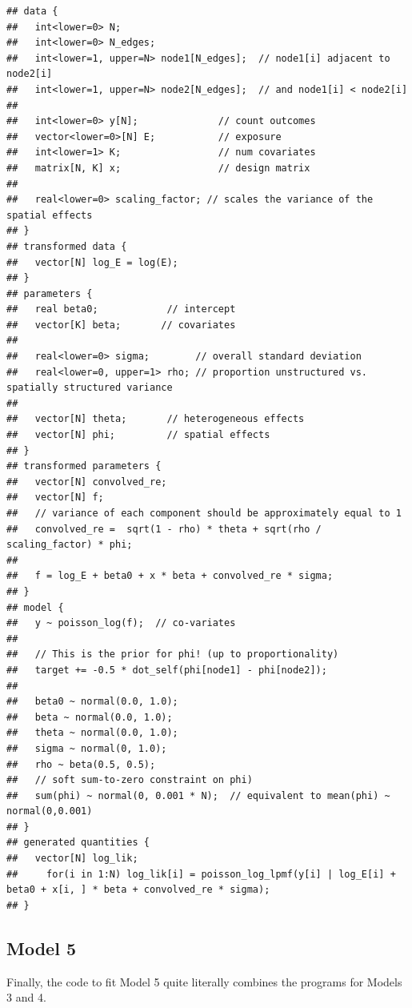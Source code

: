 \documentclass[]{article}
\begin{document}
\begin{verbatim}
## data {
##   int<lower=0> N;
##   int<lower=0> N_edges;
##   int<lower=1, upper=N> node1[N_edges];  // node1[i] adjacent to node2[i]
##   int<lower=1, upper=N> node2[N_edges];  // and node1[i] < node2[i]
## 
##   int<lower=0> y[N];              // count outcomes
##   vector<lower=0>[N] E;           // exposure
##   int<lower=1> K;                 // num covariates
##   matrix[N, K] x;                 // design matrix
## 
##   real<lower=0> scaling_factor; // scales the variance of the spatial effects
## }
## transformed data {
##   vector[N] log_E = log(E);
## }
## parameters {
##   real beta0;            // intercept
##   vector[K] beta;       // covariates
## 
##   real<lower=0> sigma;        // overall standard deviation
##   real<lower=0, upper=1> rho; // proportion unstructured vs. spatially structured variance
## 
##   vector[N] theta;       // heterogeneous effects
##   vector[N] phi;         // spatial effects
## }
## transformed parameters {
##   vector[N] convolved_re;
##   vector[N] f; 
##   // variance of each component should be approximately equal to 1
##   convolved_re =  sqrt(1 - rho) * theta + sqrt(rho / scaling_factor) * phi;
##   
##   f = log_E + beta0 + x * beta + convolved_re * sigma;
## }
## model {
##   y ~ poisson_log(f);  // co-variates
## 
##   // This is the prior for phi! (up to proportionality)
##   target += -0.5 * dot_self(phi[node1] - phi[node2]);
## 
##   beta0 ~ normal(0.0, 1.0);
##   beta ~ normal(0.0, 1.0);
##   theta ~ normal(0.0, 1.0);
##   sigma ~ normal(0, 1.0);
##   rho ~ beta(0.5, 0.5);
##   // soft sum-to-zero constraint on phi)
##   sum(phi) ~ normal(0, 0.001 * N);  // equivalent to mean(phi) ~ normal(0,0.001)
## }
## generated quantities {
##   vector[N] log_lik; 
##     for(i in 1:N) log_lik[i] = poisson_log_lpmf(y[i] | log_E[i] + beta0 + x[i, ] * beta + convolved_re * sigma);
## }
\end{verbatim}

\subsection{Model 5}\label{model-5-1}

Finally, the code to fit Model 5 quite literally combines the programs
for Models 3 and 4.
\end{document}

